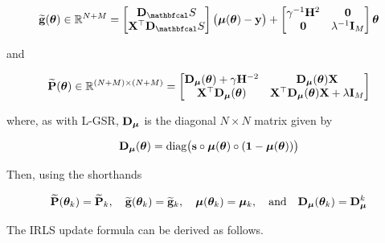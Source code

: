 \begin{equation}
    \widetilde{\g}(\thetaa) \in \R^{N + M} = \begin{bmatrix}
        \D_\St \\ \X^\top \D_\St
    \end{bmatrix} \big(\muu(\thetaa) - \y\big) + \begin{bmatrix}
        \gamma^{-1} \HH^2 & \zero \\
    \zero & \lambda^{-1} \I_M
    \end{bmatrix} \thetaa
\end{equation}

and 

\begin{equation}
    \widetilde{\mathbf{P}}(\boldsymbol{\theta})  \in \mathbb{R}^{(N + M) \times (N + M)} = \begin{bmatrix}
        \mathbf{D}_{\boldsymbol{\mu}}(\boldsymbol{\theta}) + \gamma \mathbf{H}^{-2} & \mathbf{D}_{\boldsymbol{\mu}}(\boldsymbol{\theta}) \mathbf{X} \\ 
        \mathbf{X}^\top \mathbf{D}_{\boldsymbol{\mu}}(\boldsymbol{\theta})  & \mathbf{X}^\top \mathbf{D}_{\boldsymbol{\mu}}(\boldsymbol{\theta}) \mathbf{X} + \lambda \mathbf{I}_M
    \end{bmatrix}
\end{equation}

where, as with L-GSR, $\mathbf{D}_{\boldsymbol{\mu}}$ is the diagonal $N \times N$ matrix given by

\begin{equation}
    \mathbf{D}_{\boldsymbol{\mu}}(\boldsymbol{\theta}) = \text{diag}\big(\mathbf{s} \circ \boldsymbol{\mu}(\boldsymbol{\theta}) \circ (\mathbf{1} - \boldsymbol{\mu}(\boldsymbol{\theta}))\big)
\end{equation}

Then, using the shorthands 

\begin{equation*}
    \widetilde{\mathbf{P}}(\boldsymbol{\theta}_k) = \widetilde{\mathbf{P}}_k, \quad \widetilde{\mathbf{g}}(\boldsymbol{\theta}_k) = \widetilde{\mathbf{g}}_k, \quad \boldsymbol{\mu}(\boldsymbol{\theta}_k) = \boldsymbol{\mu}_k, \quad \text{and} \quad \mathbf{D}_{\boldsymbol{\mu}}(\boldsymbol{\theta}_k) = \mathbf{D}_{\boldsymbol{\mu}}^k
\end{equation*}

The IRLS update formula can be derived as follows. 

